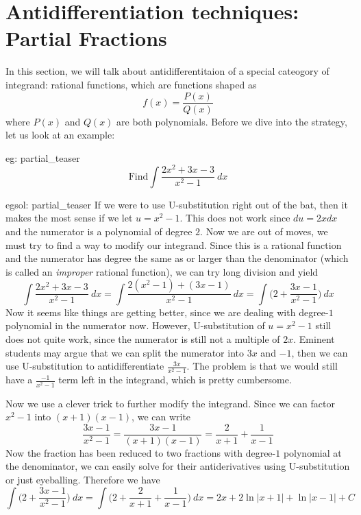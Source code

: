 \newpage
\section{Antidifferentiation techniques: Partial Fractions}
In this section, we will talk about antidifferentitaion of a special cateogory of integrand: rational functions, which are functions shaped as 
\[f(x) = \frac{P(x)}{Q(x)}\]
where $P(x)$ and $Q(x)$ are both polynomials.  Before we dive into the strategy, let us look at an example:
\begin{eg}[]{eg: partial_teaser}
    \[\text{Find}\int \frac{2x^2+3x-3}{x^2-1}~dx\]
\end{eg}
\begin{egsol}[]{egsol: partial_teaser}
    If we were to use U-substitution right out of the bat, then it makes the most sense if we let $u=x^2-1$.  This does not work since $du = 2xdx$ and the numerator is a polynomial of degree $2$.  Now we are out of moves, we must try to find a way to modify our integrand.  Since this is a rational function and the numerator has degree the same as or larger than the denominator (which is called an \textit{improper} rational function), we can try long division and yield
    \[\int \frac{2x^2+3x-3}{x^2-1}~dx = \int \frac{2(x^2-1) + (3x-1)}{x^2-1}~dx = \int \Big(2 + \frac{3x-1}{x^2-1}\Big)~dx\]
    Now it seems like things are getting better, since we are dealing with degree-$1$ polynomial in the numerator now.  However, U-substitution of $u=x^2-1$ still does not quite work, since the numerator is still not a multiple of $2x$.  Eminent students may argue that we can split the numerator into $3x$ and $-1$, then we can use U-substitution to antidifferentiate $\frac{3x}{x^2-1}$.  The problem is that we would still have a $\frac{-1}{x^2-1}$ term left in the integrand, which is pretty cumbersome.

    Now we use a clever trick to further modify the integrand.  Since we can factor $x^2-1$ into $(x+1)(x-1)$, we can write
    \[\frac{3x-1}{x^2-1} = \frac{3x-1}{(x+1)(x-1)} = \frac{2}{x+1} + \frac{1}{x-1}\]
    Now the fraction has been reduced to two fractions with degree-$1$ polynomial at the denominator, we can easily solve for their antiderivatives using U-substitution or just eyeballing.  Therefore we have
    \[\int \Big(2 + \frac{3x-1}{x^2-1}\Big)~dx = \int \Big(2 + \frac{2}{x+1} + \frac{1}{x-1}\Big)~dx = 2x + 2\ln|x+1| + \ln|x-1| + C\]
\end{egsol}

